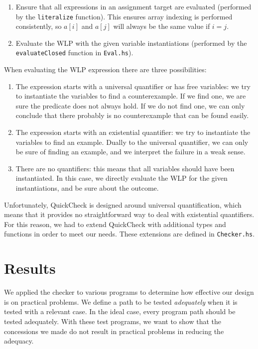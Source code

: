 \documentclass[a4paper]{article}
\begin{document}
\begin{enumerate}
\item Ensure that all expressions in an assignment target are evaluated (performed
by the \texttt{literalize} function). This ensures array indexing is performed
consistently, so $a[i]$ and $a[j]$ will always be the same value if $i = j$.
\item Evaluate the WLP with the given variable instantiations (performed by the
\texttt{evaluateClosed} function in \texttt{Eval.hs}).
\end{enumerate}

When evaluating the WLP expression there are three possibilities:

\begin{enumerate}
\item The expression starts with a universal quantifier or has free variables:
we try to instantiate the variables to find a counterexample. If we find one, we
are sure the predicate does not always hold. If we do not find one, we can only
conclude that there probably is no counterexample that can be found easily.
\item The expression starts with an existential quantifier: we try to instantiate
the variables to find an example. Dually to the universal quantifier, we can only
be sure of finding an example, and we interpret the failure in a weak sense.
\item There are no quantifiers: this means that all variables should have been
instantiated. In this case, we directly evaluate the WLP for the given
instantiations, and be sure about the outcome.
\end{enumerate}

Unfortunately, QuickCheck is designed around universal quantification, which means
that it provides no straightforward way to deal with existential quantifiers.
For this reason, we had to extend QuickCheck with additional types and functions
in order to meet our needs. These extensions are defined in \texttt{Checker.hs}.

\section{Results}

We applied the checker to various programs to determine how effective our design
is on practical problems. We define a path to be tested \emph{adequately} when
it is tested with a relevant case. In the ideal case, every program path should
be tested adequately. With these test programs, we want to show that the
concessions we made do not result in practical problems in reducing the adequacy.
\end{document}
